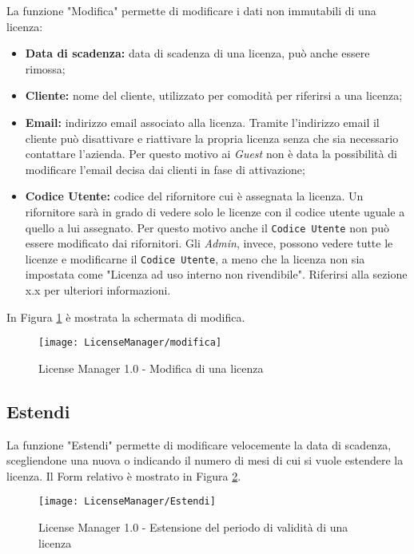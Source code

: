 La funzione "Modifica" permette di modificare i dati non immutabili di una licenza:
\begin{itemize}
\item \textbf{Data di scadenza:} data di scadenza di una licenza, può anche essere rimossa;
\item \textbf{Cliente:} nome del cliente, utilizzato per comodità per riferirsi a una licenza;
\item \textbf{Email:} indirizzo email associato alla licenza. Tramite l’indirizzo email il cliente può disattivare e riattivare la propria licenza senza che sia necessario contattare l’azienda. Per questo motivo ai \textit{Guest} non è data la possibilità di modificare l’email decisa dai clienti in fase di attivazione;
\item \textbf{Codice Utente:} codice del rifornitore cui è assegnata la licenza. Un rifornitore sarà in grado di vedere solo le licenze con il codice utente uguale a quello a lui assegnato. Per questo motivo anche il \texttt{Codice Utente} non può essere modificato dai rifornitori.
Gli \textit{Admin}, invece, possono vedere tutte le licenze e modificarne il \texttt{Codice Utente}, a meno che la licenza non sia impostata come "Licenza ad uso interno non rivendibile". Riferirsi alla sezione x.x per ulteriori informazioni.
\end{itemize} 

In Figura \ref{modifica} è mostrata la schermata di modifica.

\begin{figure}[!h] 
    \centering 
    \texttt{[image: LicenseManager/modifica]} 
    \caption{License Manager 1.0 - Modifica di una licenza}
\label{modifica}
\end{figure}

\newpage
\subsection{Estendi}
La funzione "Estendi" permette di modificare velocemente la data di scadenza, scegliendone una nuova o indicando il numero di mesi di cui si vuole estendere la licenza.
Il Form relativo è mostrato in Figura \ref{estendi}.

\begin{figure}[!h] 
    \centering 
    \texttt{[image: LicenseManager/Estendi]} 
    \caption{License Manager 1.0 - Estensione del periodo di validità di una licenza}
\label{estendi}
\end{figure}

